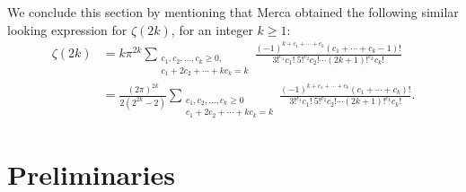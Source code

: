 \documentclass[12pt]{amsart}
\newcommand{\C}{{\mathbb C}}
\newcommand{\thmref}[1]{Theorem~\ref{#1}}
\newcommand{\rmkref}[1]{Remark~\ref{#1}}
\begin{document}

We conclude this section by mentioning that Merca \cite{MM} obtained the following similar looking expression for $\zeta(2k)$, for an integer $k\geq 1$:
\begin{align*}
\zeta(2k)&=k\pi^{2k}\sum_{ \substack{c_1,c_2, \ldots,c_k \geq 0, \\ c_1+2c_2+\cdots+kc_k=k}}\frac{(-1)^{k+c_1+\cdots+c_k}(c_1+\cdots+c_k-1)!}{3!^{c_1}c_1! \ 5!^{c_2}c_2!\cdots (2k+1)!^{c_k}c_k!}\\
&=\frac{(2\pi)^{2k}}{2(2^{2k}-2)}\sum_{\substack{c_1,c_2,\ldots,c_k\geq 0\\ c_1+2c_2+\cdots+kc_k=k}}\frac{(-1)^{k+c_1+\cdots+c_k}(c_1+\cdots+c_k)!}{3!^{c_1}c_1! \ 5!^{c_2}c_2!\cdots (2k+1)!^{c_k}c_k!}.
\end{align*}



\section{Preliminaries}
\end{document}
